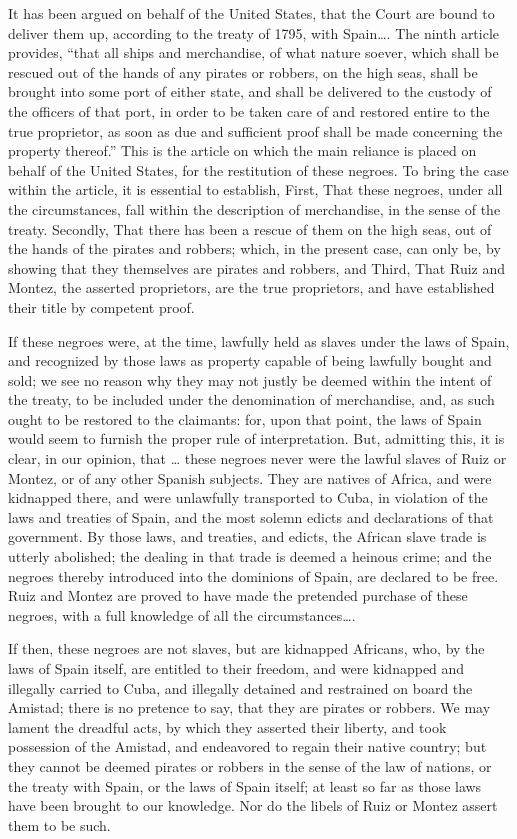 It has been argued on behalf of the United States, that the Court are bound to
deliver them up, according to the treaty of 1795, with Spain{\dots}. The ninth
article provides, ``that all ships and merchandise, of what nature soever, which
shall be rescued out of the hands of any pirates or robbers, on the high seas,
shall be brought into some port of either state, and shall be delivered to the
custody of the officers of that port, in order to be taken care of and restored
entire to the true proprietor, as soon as due and sufficient proof shall be
made concerning the property thereof.'' This is the article on which the main
reliance is placed on behalf of the United States, for the restitution of these
negroes. To bring the case within the article, it is essential to establish,
First, That these negroes, under all the circumstances, fall within the
description of merchandise, in the sense of the treaty. Secondly, That there
has been a rescue of them on the high seas, out of the hands of the pirates and
robbers; which, in the present case, can only be, by showing that they
themselves are pirates and robbers, and Third, That Ruiz and Montez, the
asserted proprietors, are the true proprietors, and have established their
title by competent proof.

If these negroes were, at the time, lawfully held as slaves under the laws of
Spain, and recognized by those laws as property capable of being lawfully
bought and sold; we see no reason why they may not justly be deemed within the
intent of the treaty, to be included under the denomination of merchandise,
and, as such ought to be restored to the claimants: for, upon that point, the
laws of Spain would seem to furnish the proper rule of interpretation. But,
admitting this, it is clear, in our opinion, that {\dots} these negroes never
were the lawful slaves of Ruiz or Montez, or of any other Spanish subjects.
They are natives of Africa, and were kidnapped there, and were unlawfully
transported to Cuba, in violation of the laws and treaties of Spain, and the
most solemn edicts and declarations of that government. By those laws, and
treaties, and edicts, the African slave trade is utterly abolished; the dealing
in that trade is deemed a heinous crime; and the negroes thereby introduced
into the dominions of Spain, are declared to be free. Ruiz and Montez are
proved to have made the pretended purchase of these negroes, with a full
knowledge of all the circumstances{\dots}.

If then, these negroes are not slaves, but are kidnapped Africans, who, by the
laws of Spain itself, are entitled to their freedom, and were kidnapped and
illegally carried to Cuba, and illegally detained and restrained on board the
Amistad; there is no pretence to say, that they are pirates or robbers. We may
lament the dreadful acts, by which they asserted their liberty, and took
possession of the Amistad, and endeavored to regain their native country; but
they cannot be deemed pirates or robbers in the sense of the law of nations, or
the treaty with Spain, or the laws of Spain itself; at least so far as those
laws have been brought to our knowledge. Nor do the libels of Ruiz or Montez
assert them to be such.

